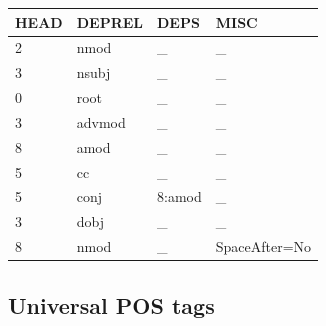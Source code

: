 \documentclass[12pt,a4paper,english
]{tutthesis}
\begin{document}
\begin{tabular}{l l l l}
HEAD & DEPREL & DEPS & MISC \\
\hline
2 & nmod & \_ & \_ \\
3 & nsubj & \_ & \_ \\
0 & root & \_ & \_ \\
3 & advmod & \_ & \_ \\
8 & amod & \_ & \_ \\
5 & cc & \_ & \_ \\
5 & conj & 8:amod & \_ \\
3 & dobj & \_ & \_ \\
8 & nmod & \_ & SpaceAfter=No
\end{tabular}

\subsection{Universal POS tags}
\end{document}
